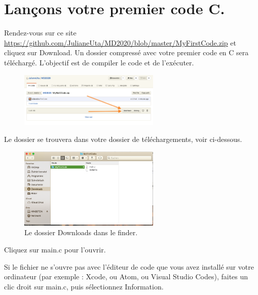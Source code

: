 \documentclass{article}
\begin{document}
\section{Lançons votre premier code C.}
Rendez-vous sur ce site \href{https://github.com/JulianeUta/MD2020/blob/master/MyFirstCode.zip}{https://github.com/JulianeUta/MD2020/blob/master/MyFirstCode.zip} et cliquez sur Download. Un dossier compressé avec votre premier code en C sera téléchargé. L'objectif est de compiler le code et de l'exécuter.
\begin{figure}[H]
\center
\includegraphics[width=0.6\textwidth]{Plots/FirstCode_1.png}
\end{figure}
Le dossier se trouvera dans votre dossier de téléchargements, voir ci-dessous.
\begin{figure}[H]
\center
\includegraphics[width=0.6\textwidth]{Plots/DownloadMyFirstCode.png}
\caption{Le dossier Downloads dans le finder.\label{F:locationMyFirstCode}}
\end{figure}
Cliquez sur main.c pour l'ouvrir. 

Si le fichier ne s'ouvre pas avec l'éditeur de code que vous avez installé sur votre ordinateur (par exemple : Xcode, ou Atom, ou Visual Studio Codes), faites un clic droit sur main.c, puis sélectionnez Information. 
\end{document}
